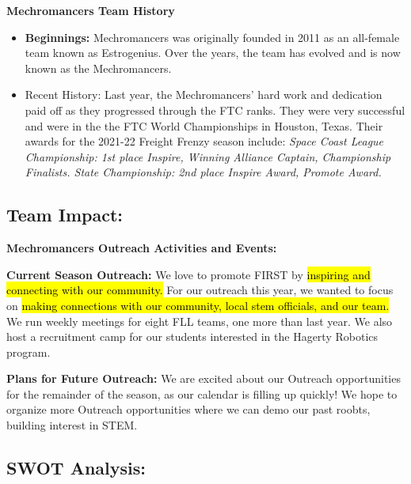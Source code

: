 \textbf{\Large Mechromancers Team History}

\begin{itemize}
\item \textbf{Beginnings:}  Mechromancers was originally founded in 2011 as an {all-female team} known as Estrogenius.  Over the years, the team has evolved and is now known as the Mechromancers.
\item {Recent History:} Last year, the Mechromancers' hard work and dedication paid off as they progressed through the FTC ranks. They were very successful and were in the { the FTC World Championships in Houston, Texas.} Their awards for the 2021-22 Freight Frenzy season include:
\textit{Space Coast League Championship: 1st place Inspire, Winning Alliance Captain, Championship Finalists. State Championship: 2nd place Inspire Award, Promote Award.}
\end{itemize}

\clearpage
{}
\subsection*{\textbf{\Huge Team Impact:}}
\vspace{.2cm}
\setlength{\parindent}{.25in} 

\textbf{\Large Mechromancers Outreach Activities and Events:}

\textbf{Current Season Outreach:} We love to promote FIRST by \hl{inspiring and connecting with our community.} For our outreach this year, we wanted to focus on \hl{making connections with our community, local stem officials, and our team.} We run weekly meetings for eight FLL teams, one more than last year. We also host a recruitment camp for our students interested in the Hagerty Robotics program.


\textbf{Plans for Future Outreach:} We are excited about our Outreach opportunities for the remainder of the season, as our calendar is filling up quickly! We hope to organize more Outreach opportunities where we can demo our past roobts, building interest in STEM.


\subsection*{\textbf{\Huge SWOT Analysis:}}
\vspace{.2cm}
\setlength{\parindent}{.25in} 

